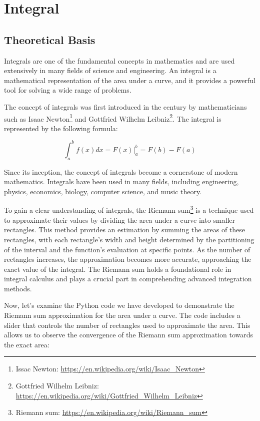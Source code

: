 \documentclass[13pt,a4paper]{report}
\begin{document}
\newpage
\section{Integral}
\subsection{Theoretical Basis}
Integrals are one of the fundamental concepts in mathematics and are used extensively in many fields of science and engineering. An integral is a mathematical representation of the area under a curve, and it provides a powerful tool for solving a wide range of problems.

The concept of integrals was first introduced in the  century by mathematicians such as Isaac Newton\footnote{Issac Newton: \url{https://en.wikipedia.org/wiki/Isaac_Newton}} and Gottfried Wilhelm Leibniz\footnote{Gottfried Wilhelm Leibniz: \url{https://en.wikipedia.org/wiki/Gottfried_Wilhelm_Leibniz}}. The integral is represented by the following formula:

$$\int_a^b f(x)dx=F(x)\bigg|_a^b=F(b)-F(a)$$

Since its inception, the concept of integrals become a cornerstone of modern mathematics. Integrals have been used in many fields, including engineering, physics, economics, biology, computer science, and music theory.

To gain a clear understanding of integrals, the Riemann sum\footnote{Riemann sum: \url{https://en.wikipedia.org/wiki/Riemann_sum}} is a technique used to approximate their values by dividing the area under a curve into smaller rectangles. This method provides an estimation by summing the areas of these rectangles, with each rectangle's width and height determined by the partitioning of the interval and the function's evaluation at specific points. As the number of rectangles increases, the approximation becomes more accurate, approaching the exact value of the integral. The Riemann sum holds a foundational role in integral calculus and plays a crucial part in comprehending advanced integration methods.

Now, let's examine the Python code we have developed to demonstrate the Riemann sum approximation for the area under a curve. The code includes a slider that controls the number of rectangles used to approximate the area. This allows us to observe the convergence of the Riemann sum approximation towards the exact area:\\[-0.3cm]
\end{document}
